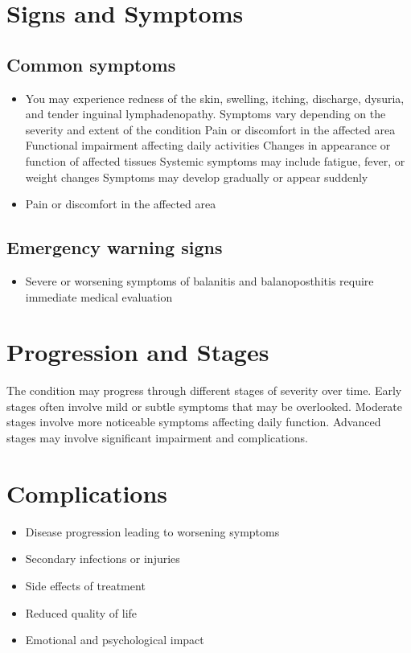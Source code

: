 \section{Signs and Symptoms}

\subsection{Common symptoms}
\begin{itemize}[noitemsep]
  \item You may experience redness of the skin, swelling, itching, discharge, dysuria, and tender inguinal lymphadenopathy. Symptoms vary depending on the severity and extent of the condition Pain or discomfort in the affected area Functional impairment affecting daily activities Changes in appearance or function of affected tissues Systemic symptoms may include fatigue, fever, or weight changes Symptoms may develop gradually or appear suddenly
  \item Pain or discomfort in the affected area
  \end{itemize}

\subsection{Emergency warning signs}
\begin{itemize}[noitemsep]
  \item Severe or worsening symptoms of balanitis and balanoposthitis require immediate medical evaluation
\end{itemize}
\section{Progression and Stages}
The condition may progress through different stages of severity over time. Early stages often involve mild or subtle symptoms that may be overlooked. Moderate stages involve more noticeable symptoms affecting daily function. Advanced stages may involve significant impairment and complications.
\section{Complications}
\begin{itemize}[noitemsep]
  \item Disease progression leading to worsening symptoms
  \item Secondary infections or injuries
  \item Side effects of treatment
  \item Reduced quality of life
  \item Emotional and psychological impact
\end{itemize}
